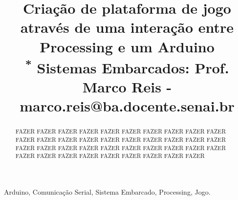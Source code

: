 \documentclass[conference]{IEEEtran}
\begin{document}
\title{Criação de plataforma de jogo através de uma interação entre Processing e um Arduino\\
{\footnotesize \textsuperscript{*} Sistemas Embarcados: Prof. Marco Reis - marco.reis@ba.docente.senai.br}
}


\author{
\and
{}
\and
{}
\and
{}
}
\maketitle

\begin{abstract}
    FAZER FAZER FAZER FAZER FAZER FAZER FAZER FAZER FAZER FAZER FAZER FAZER FAZER FAZER FAZER FAZER FAZER FAZER FAZER FAZER FAZER FAZER FAZER FAZER FAZER FAZER FAZER FAZER FAZER FAZER FAZER FAZER FAZER FAZER FAZER FAZER FAZER FAZER FAZER 
\end{abstract}

\begin{IEEEkeywords}
    Arduino, Comunicação Serial, Sistema Embarcado, Processing, Jogo.
\end{IEEEkeywords}
\end{document}

